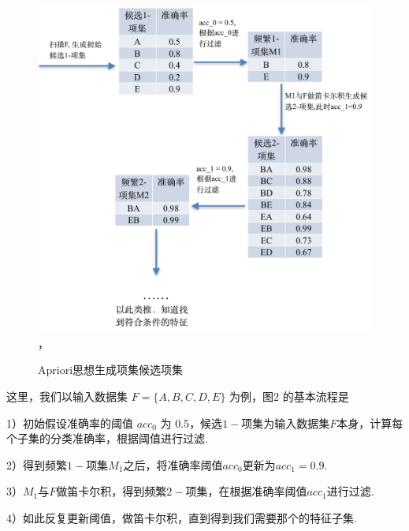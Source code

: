 \documentclass{njubachelor}
\begin{document}
\begin{figure}[!ht]
    \centering
    \includegraphics[width=5.5in]{pic/fig2}， 
    \caption{Apriori思想生成项集候选项集}
\end{figure}

这里，我们以输入数据集 $F=\{A,B,C,D,E\}$ 为例，图2 的基本流程是

1）初始假设准确率的阈值 $acc_0$ 为 $0.5$，候选$1-$项集为输入数据集$F$本身，计算每个子集的分类准确率，根据阈值进行过滤.

2）得到频繁$1-$项集$M_1$之后，将准确率阈值$acc_0$更新为$acc_1 = 0.9$.

3）$M_1$与$F$做笛卡尔积，得到频繁$2-$项集，在根据准确率阈值$acc_1$进行过滤.

4）如此反复更新阈值，做笛卡尔积，直到得到我们需要那个的特征子集.
\end{document}
